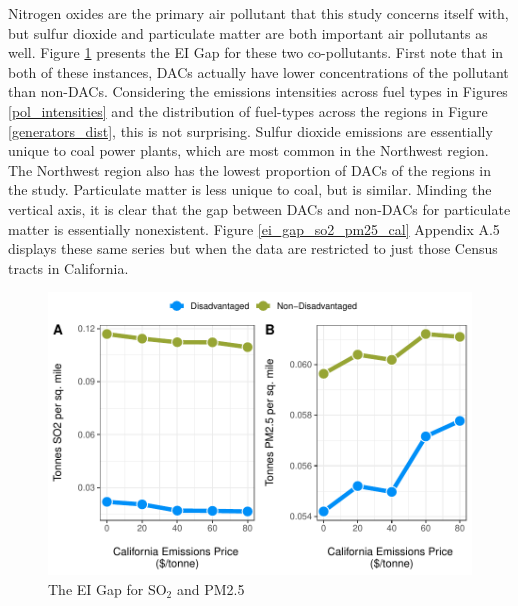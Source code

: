 Nitrogen oxides are the primary air pollutant that this study concerns itself with, but sulfur dioxide and particulate matter are both important air pollutants as well. Figure \ref{ei_gap_so2_pm25} presents the EI Gap for these two co-pollutants. First note that in both of these instances, DACs actually have lower concentrations of the pollutant than non-DACs. Considering the emissions intensities across fuel types in Figures \ref{pol_intensities} and the distribution of fuel-types across the regions in Figure \ref{generators_dist}, this is not surprising. Sulfur dioxide emissions are essentially unique to coal power plants, which are most common in the Northwest region. The Northwest region also has the lowest proportion of DACs of the regions in the study. Particulate matter is less unique to coal, but is similar. Minding the vertical axis, it is clear that the gap between DACs and non-DACs for particulate matter is essentially nonexistent. Figure \ref{ei_gap_so2_pm25_cal} Appendix A.5 displays these same series but when the data are restricted to just those Census tracts in California.
\begin{figure}
    \centering
    \caption{The EI Gap for SO$_2$ and PM2.5 \label{ei_gap_so2_pm25}}
    \includegraphics[width=\textwidth]{figures/chapter5_figures/ei_gap_so2_pm25.pdf}
\end{figure}







